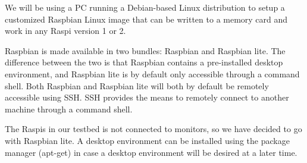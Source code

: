 We will be using a \ac{PC} running a Debian-based Linux distribution
to setup a customized Raspbian Linux image that can be written to
a memory card and work in any \ac{Raspi} version 1 or 2.





%






Raspbian is made available in two bundles: Raspbian and Raspbian lite.
The difference between the two is that Raspbian contains a pre-installed desktop
environment, and Raspbian lite is by default only accessible through a 
command shell. Both Raspbian and Raspbian lite will both by default be remotely
accessible using \ac{SSH}. \ac{SSH} provides the means to remotely
connect to another machine through a command shell.

The \ac{Raspi}s in our testbed is not connected to monitors, so we
have decided to go with Raspbian lite.
A desktop environment can be installed using the package manager
(apt-get) in case a desktop environment will be desired at a later
time.


